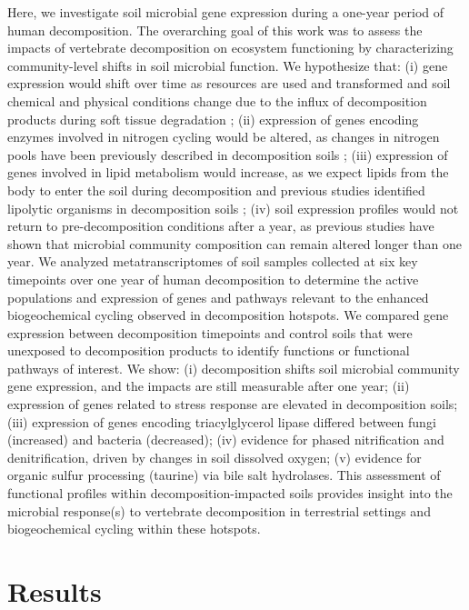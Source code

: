 \documentclass[
  sn-nature,
  lineno, referee]{sn-jnl}
\begin{document}
Here, we investigate soil microbial gene expression during a one-year
period of human decomposition. The overarching goal of this work was to
assess the impacts of vertebrate decomposition on ecosystem functioning
by characterizing community-level shifts in soil microbial function. We
hypothesize that: (i) gene expression would shift over time as resources
are used and transformed and soil chemical and physical conditions
change due to the influx of decomposition products during soft tissue
degradation
\citep{keenan_mortality_2018, fancher_evaluation_2017, debruyn_comparative_2021};
(ii) expression of genes encoding enzymes involved in nitrogen cycling
would be altered, as changes in nitrogen pools have been previously
described in decomposition soils \citep{keenan_mortality_2018}; (iii)
expression of genes involved in lipid metabolism would increase, as we
expect lipids from the body to enter the soil during decomposition and
previous studies identified lipolytic organisms in decomposition soils
\citep{howard_characterization_2010, mason_body_2022}; (iv) soil
expression profiles would not return to pre-decomposition conditions
after a year, as previous studies have shown that microbial community
composition \citep{cobaugh_functional_2015, singh_temporal_2018} can
remain altered longer than one year. We analyzed metatranscriptomes of
soil samples collected at six key timepoints over one year of human
decomposition to determine the active populations and expression of
genes and pathways relevant to the enhanced biogeochemical cycling
observed in decomposition hotspots. We compared gene expression between
decomposition timepoints and control soils that were unexposed to
decomposition products to identify functions or functional pathways of
interest. We show: (i) decomposition shifts soil microbial community
gene expression, and the impacts are still measurable after one year;
(ii) expression of genes related to stress response are elevated in
decomposition soils; (iii) expression of genes encoding triacylglycerol
lipase differed between fungi (increased) and bacteria (decreased); (iv)
evidence for phased nitrification and denitrification, driven by changes
in soil dissolved oxygen; (v) evidence for organic sulfur processing
(taurine) via bile salt hydrolases. This assessment of functional
profiles within decomposition-impacted soils provides insight into the
microbial response(s) to vertebrate decomposition in terrestrial
settings and biogeochemical cycling within these hotspots.

\section{Results}\label{results}
\end{document}
